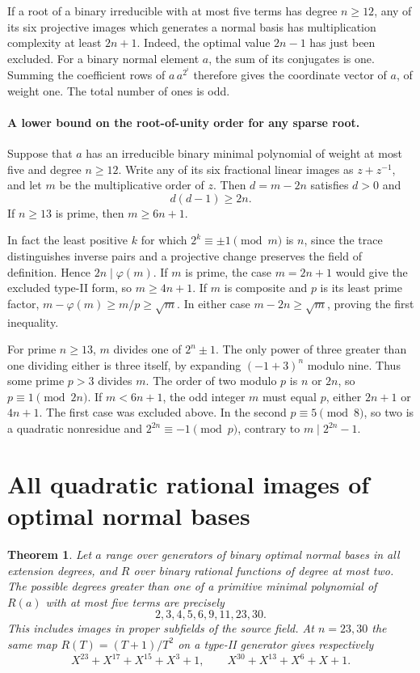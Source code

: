 \documentclass[11pt]{article}
\newtheorem{theorem}{Theorem}
\begin{document}
If a root of a binary irreducible with at most five terms has degree
\(n\ge12\), any of its six projective images which generates a normal
basis has multiplication complexity at least \(2n+1\).
Indeed, the optimal value \(2n-1\) has just been excluded. For a binary
normal element \(a\), the sum of its conjugates is one. Summing the
coefficient rows of \(a\,a^{2^i}\) therefore gives the coordinate
vector of \(a\), of weight one. The total number of ones is odd.

\paragraph{A lower bound on the root-of-unity order for any sparse root.}
Suppose that \(a\) has an irreducible binary minimal polynomial of weight
at most five and degree \(n\ge12\). Write any of its six fractional
linear images as \(z+z^{-1}\), and let \(m\) be the multiplicative
order of \(z\). Then \(d=m-2n\) satisfies \(d>0\) and
\[
                     d(d-1)\ge 2n .
\]
If \(n\ge13\) is prime, then \(m\ge6n+1\).

In fact the least positive \(k\) for which \(2^k\equiv\pm1\pmod m\)
is \(n\), since the trace distinguishes inverse pairs and a projective
change preserves the field of definition. Hence \(2n\mid\varphi(m)\).
If \(m\) is prime, the case \(m=2n+1\) would give the excluded type-II
form, so \(m\ge4n+1\). If \(m\) is composite and \(p\) is its
least prime factor, \(m-\varphi(m)\ge m/p\ge\sqrt m\). In either
case \(m-2n\ge\sqrt m\), proving the first inequality.

For prime \(n\ge13\), \(m\) divides one of \(2^n\pm1\).
The only power of three greater than one dividing either is three
itself, by expanding \((-1+3)^n\) modulo nine. Thus some prime
\(p>3\) divides \(m\). The order of two modulo \(p\) is \(n\) or
\(2n\), so \(p\equiv1\pmod{2n}\). If \(m<6n+1\), the odd
integer \(m\) must equal \(p\), either \(2n+1\) or \(4n+1\).
The first case was excluded above. In the second \(p\equiv5\pmod8\),
so two is a quadratic nonresidue and \(2^{2n}\equiv-1\pmod p\),
contrary to \(m\mid 2^{2n}-1\).

\clearpage
\section{All quadratic rational images of optimal normal bases}
\label{sec:quadratic-optimal-images}

\begin{theorem}
Let \(a\) range over generators of binary optimal normal bases in all
extension degrees, and \(R\) over binary rational functions of degree
at most two. The possible degrees greater than one of a primitive
minimal polynomial of \(R(a)\) with at most five terms are precisely
\[
                        2,3,4,5,6,9,11,23,30 .
\]
This includes images in proper subfields of the source field.
At \(n=23,30\) the same map \(R(T)=(T+1)/T^2\) on a type-II
generator gives respectively
\[
 X^{23}+X^{17}+X^{15}+X^3+1,\qquad X^{30}+X^{13}+X^6+X+1 .
\]
\end{theorem}
\end{document}

